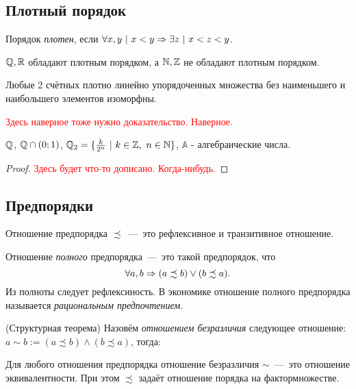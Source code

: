 \subsection{Плотный порядок}

\begin{definition}
	Порядок \textit{плотен}, если $\forall x, y\ |\ x < y \Rightarrow \exists z\ |\ x < z < y$.
\end{definition}

\begin{example}
	$\mathbb{Q}, \mathbb{R}$ обладают плотным порядком, а $\mathbb{N}, \mathbb{Z}$ не обладают плотным порядком.
\end{example}

\begin{theorem}
	Любые 2 счётных плотно линейно упорядоченных множества без наименьшего и наибольшего элементов изоморфны.
\end{theorem}

\textcolor{red}{Здесь наверное тоже нужно доказательство. Наверное.}

\begin{example}
	$\mathbb{Q}$, $\mathbb{Q} \cap (0;1)$, $\Q_2 = \{\frac{k}{2^n}\ |\ k \in \Z,\ n \in \N\}$, $\mathbb{A}$ - алгебраические числа.
\end{example}

\begin{proof}
\textcolor{red}{Здесь будет что-то дописано. Когда-нибудь.}
\end{proof}

\subsection{Предпорядки}

\begin{definition}
	Отношение предпорядка $\precsim$~---~это рефлексивное и транзитивное отношение.
\end{definition}

\begin{definition}
	Отношение \textit{полного} предпорядка~---~это такой предпорядок, что
	$$
		\forall a, b \Rightarrow (a \precsim b) \vee (b \precsim a).
	$$
	Из полноты следует рефлексиность. В экономике отношение полного предпорядка называется \textit{рациональным предпочтением}.
\end{definition}

\begin{theorem} (Структурная теорема)
	Назовём \textit{отношением безразличия} следующее отношение: 
	$a \sim b := (a \precsim b) \wedge (b \precsim a)$, тогда:
	
	Для любого отношения предпорядка отношение безразличия $\sim$~---~это отношение эквивалентности. При этом $\precsim$ задаёт отношение порядка на фактормножестве.
\end{theorem}

